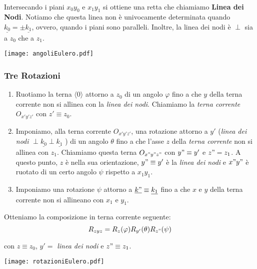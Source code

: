 \paragraph{}
Intersecando i piani $x_0y_0$ e $x_1y_1$ si ottiene una retta che chiamiamo \textbf{Linea dei Nodi}. Notiamo che questa linea non è univocamente determinata quando $\underline{k_0} = \pm \underline{k_1}$, ovvero, quando i piani sono paralleli. Inoltre, la linea dei nodi è $\perp$ sia a $z_0$ che a $z_1$.

\texttt{[image: angoliEulero.pdf]}

\subsubsection{Tre Rotazioni}
\begin{enumerate}
	\item Ruotiamo la terna $\langle0\rangle$ attorno a $z_0$ di un angolo $\varphi$ fino a che $y$ della terna corrente non si allinea con la \emph{linea dei nodi}. Chiamiamo la \emph{terna corrente} $O_{x'y'z'}$ con $z' \equiv z_0$.
	\item Imponiamo, alla terna corrente $O_{x'y'z'}$, una rotazione attorno a $y'$ (\emph{linea dei nodi} $\perp \underline{k_0} \perp \underline{k_1}$ ) di un angolo $\theta$ fino a che l'asse $z$ della \emph{terna corrente} non si allinea con $z_1$. Chiamiamo questa terna $O_{x"y"z"}$ con $y" \equiv y'$ e $z" = z_1$. A questo punto, $z$ è nella sua orientazione, $y" \equiv y'$ è la \emph{linea dei nodi} e $x"y"$ è ruotato di un certo angolo $\psi$ rispetto a $x_1y_1$.
	\item Imponiamo una rotazione $\psi$ attorno a $\underline{k"} \equiv \underline{k_1}$ fino a che $x$ e $y$ della terna corrente non si allineano con $x_1$ e $y_1$.
\end{enumerate}
Otteniamo la composizione in terna corrente seguente:
\begin{equation}
	R_{zyz} = R_z(\varphi)R_{y'}(\theta)R_{z"}(\psi)
\end{equation}

con $z \equiv z_0$, $y' = $\emph{ linea dei nodi} e $z" \equiv z_1$. 

\begin{center}
\texttt{[image: rotazioniEulero.pdf]}
\end{center}



